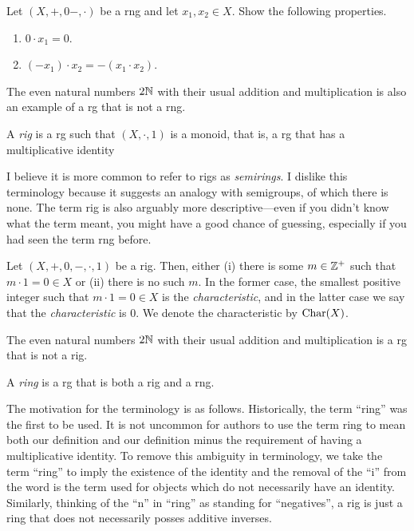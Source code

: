 \begin{exr}\label{exrA.1.43}
Let $(X,+,0-,\cdot )$ be a rng and let $x_1,x_2\in X$.  Show the following properties.
\begin{enumerate}
\item $0\cdot x_1=0$.
\item $(-x_1)\cdot x_2=-(x_1\cdot x_2)$.
\end{enumerate}
\end{exr}
\begin{exm}
The even natural numbers $2\mathbb{N}$ with their usual addition and multiplication is also an example of a rg that is not a rng.
\end{exm}
\begin{dfn}[Rig]\label{dfnA.1.33}
A \emph{rig} is a rg such that $(X,\cdot ,1)$ is a monoid, that is, a rg that has a multiplicative identity
\begin{rmk}
I believe it is more common to refer to rigs as \emph{semirings}.  I dislike this terminology because it suggests an analogy with semigroups, of which there is none.  The term rig is also arguably more descriptive---even if you didn't know what the term meant, you might have a good chance of guessing, especially if you had seen the term rng before.
\end{rmk}
\end{dfn}
\begin{dfn}[Characteristic]
Let $(X,+,0,-,\cdot ,1)$ be a rig.  Then, either (i) there is some $m\in \mathbb{Z} ^+$ such that $m\cdot 1=0\in X$ or (ii) there is no such $m$.  In the former case, the smallest positive integer such that $m\cdot 1=0\in X$ is the \emph{characteristic}, and in the latter case we say that the \emph{characteristic} is $0$.  We denote the characteristic by $\operatorname{Char} (X)$.
\end{dfn}
\begin{exm}
The even natural numbers $2\mathbb{N}$ with their usual addition and multiplication is a rg that is not a rig.
\end{exm}
\begin{dfn}[Ring]
A \emph{ring} is a rg that is both a rig and a rng.
\end{dfn}
\begin{rmk}
The motivation for the terminology is as follows.  Historically, the term ``ring'' was the first to be used.  It is not uncommon for authors to use the term ring to mean both our definition and our definition minus the requirement of having a multiplicative identity.  To remove this ambiguity in terminology, we take the term ``ring'' to imply the existence of the identity and the removal of the ``i'' from the word is the term used for objects which do not necessarily have an identity.  Similarly, thinking of the ``n'' in ``ring'' as standing for ``negatives'', a rig is just a ring that does not necessarily posses additive inverses.
\end{rmk}
